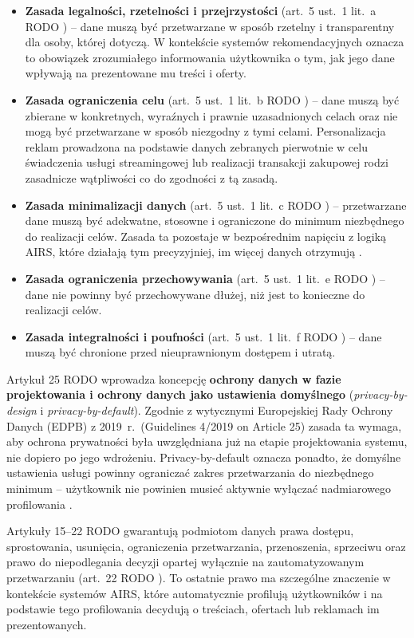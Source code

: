 \documentclass[12pt, a4paper]{article}
\begin{document}
\begin{itemize}
  \item \textbf{Zasada legalności, rzetelności i przejrzystości} (art.~5 ust.~1 lit.~a RODO \cite{rodo}) -- dane muszą być przetwarzane w sposób rzetelny i transparentny dla osoby, której dotyczą. W kontekście systemów rekomendacyjnych oznacza to obowiązek zrozumiałego informowania użytkownika o tym, jak jego dane wpływają na prezentowane mu treści i oferty.
  \item \textbf{Zasada ograniczenia celu} (art.~5 ust.~1 lit.~b RODO \cite{rodo}) -- dane muszą być zbierane w konkretnych, wyraźnych i prawnie uzasadnionych celach oraz nie mogą być przetwarzane w sposób niezgodny z tymi celami. Personalizacja reklam prowadzona na podstawie danych zebranych pierwotnie w celu świadczenia usługi streamingowej lub realizacji transakcji zakupowej rodzi zasadnicze wątpliwości co do zgodności z tą zasadą.
  \item \textbf{Zasada minimalizacji danych} (art.~5 ust.~1 lit.~c RODO \cite{rodo}) -- przetwarzane dane muszą być adekwatne, stosowne i ograniczone do minimum niezbędnego do realizacji celów. Zasada ta pozostaje w bezpośrednim napięciu z logiką AIRS, które działają tym precyzyjniej, im więcej danych otrzymują \cite{chen2025}.
  \item \textbf{Zasada ograniczenia przechowywania} (art.~5 ust.~1 lit.~e RODO \cite{rodo}) -- dane nie powinny być przechowywane dłużej, niż jest to konieczne do realizacji celów.
  \item \textbf{Zasada integralności i poufności} (art.~5 ust.~1 lit.~f RODO \cite{rodo}) -- dane muszą być chronione przed nieuprawnionym dostępem i utratą.
\end{itemize}

Artykuł 25 RODO \cite{rodo} wprowadza koncepcję \textbf{ochrony danych w fazie projektowania i ochrony danych jako ustawienia domyślnego} (\textit{privacy-by-design} i \textit{privacy-by-default}). Zgodnie z wytycznymi Europejskiej Rady Ochrony Danych (EDPB) z 2019~r.\ (Guidelines 4/2019 on Article 25) \cite{edpb2019} zasada ta wymaga, aby ochrona prywatności była uwzględniana już na etapie projektowania systemu, nie dopiero po jego wdrożeniu. Privacy-by-default oznacza ponadto, że domyślne ustawienia usługi powinny ograniczać zakres przetwarzania do niezbędnego minimum -- użytkownik nie powinien musieć aktywnie wyłączać nadmiarowego profilowania \cite{edpb2019}.

Artykuły 15--22 RODO \cite{rodo} gwarantują podmiotom danych prawa dostępu, sprostowania, usunięcia, ograniczenia przetwarzania, przenoszenia, sprzeciwu oraz prawo do niepodlegania decyzji opartej wyłącznie na zautomatyzowanym przetwarzaniu (art.~22 RODO \cite{rodo}). To ostatnie prawo ma szczególne znaczenie w kontekście systemów AIRS, które automatycznie profilują użytkowników i na podstawie tego profilowania decydują o treściach, ofertach lub reklamach im prezentowanych.
\end{document}
